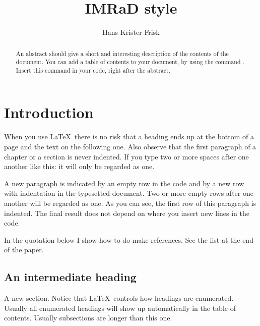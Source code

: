 \documentclass[11pt,a4paper]{article}
\begin{document}
\title{IMRaD style}
\author{Hans Krister Frisk}
\maketitle

\begin{abstract}
 An abstract should give a short and interesting description
 of the contents of the document. You can add a table of contents to your document, by using the command
. Insert this command in your code, right after the abstract.
\end{abstract}

\tableofcontents

\section{Introduction}

  When you use \LaTeX~there is no risk that a heading ends up at
  the bottom of a page and the text on the following one. Also
  observe that the first paragraph of a chapter or a section is
  never indented. If you type two or more spaces after one
  another like this:                       it will only be
  regarded as one.
	
	A new paragraph is indicated by an empty row in the code and by
  a new row with indentation in the typesetted document. Two or
  more empty rows after one another will be regarded as one. As
  you can see, the first row of this paragraph is indented.
  The
  final
  result
  does
  not
  depend
  on
  where
  you
  insert
  new
  lines
  in
  the
  code.
	
	In the quotation below I show how to do make references. See the list at the end of the paper.
	
	\subsection{An intermediate heading}

  A new section. Notice that \LaTeX\ controls how headings are
  enumerated. Usually all enumerated headings will show up
  automatically in the table of contents. Usually subsections are longer than this one.
\end{document}
